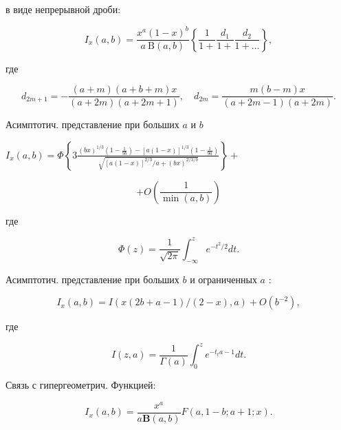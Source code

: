 \documentclass[10pt]{article}
\begin{document}
в виде непрерывной дроби:



\[

I_{x}(a, b)=\frac{x^{a}(1-x)^{b}}{a \mathrm{~B}(a, b)}\left\{\frac{1}{1+} \frac{d_{1}}{1+} \frac{d_{2}}{1+\ldots}\right\},

\]



где



\[

d_{2 m+1}=-\frac{(a+m)(a+b+m) x}{(a+2 m)(a+2 m+1)}, \quad d_{2 m}=\frac{m(b-m) x}{(a+2 m-1)(a+2 m)} .

\]



Асимптотич. представление при больших $a$ и $b$



$I_{x}(a, b)=\Phi\left\{3 \frac{(b x)^{1 / 3}\left(1-\frac{1}{9 b}\right)-[a(1-x)]^{1 / 3}\left(1-\frac{1}{9 a}\right)}{\sqrt{[a(1-x)]^{2 / 3} / a+(b x)^{2 / 3 / b}}}\right\}+$



\[

+O\left(\frac{1}{\min (a, b)}\right)

\]



где



\[

\Phi(z)=\frac{1}{\sqrt{2 \pi}} \int_{-\infty}^{z} e^{-t^{2} / 2} d t .

\]



Асимптотич. представление при больших $b$ и ограниченных $a$ :



\[

I_{x}(a, b)=I(x(2 b+a-1) /(2-x), a)+O\left(b^{-2}\right),

\]



где



\[

I(z, a)=\frac{1}{\Gamma(a)} \int_{0}^{z} e^{-t_{t} a-1} d t .

\]



Связь с гипергеометрич. Функцией:



\[

I_{x}(a, b)=\frac{x^{a}}{a \mathbf{B}(a, b)} F(a, 1-b ; a+1 ; x) .

\]
\end{document}
